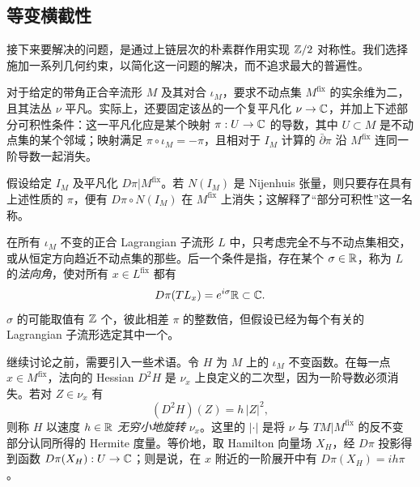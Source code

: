 \subsection{等变横截性}\label{sec:14c}
接下来要解决的问题，是通过上链层次的朴素群作用实现 $\mathbb Z/2$ 对称性。我们选择施加一系列几何约束，以简化这一问题的解决，而不追求最大的普遍性。

\begin{assumption}\label{st:14.3}
对于给定的带角正合辛流形 $M$ 及其对合 $\iota_M$，要求不动点集 $M^{\mathrm{fix}}$ 的实余维为二，且其法丛 $\nu$ 平凡。实际上，还要固定该丛的一个复平凡化 $\nu\to\mathbb C$，并加上下述部分可积性条件：这一平凡化应是某个映射 $\pi:U\to\mathbb C$ 的导数，其中 $U\subset M$ 是不动点集的某个邻域；映射满足 $\pi\circ\iota_M=-\pi$，且相对于 $I_M$ 计算的 $\bar\partial\pi$ 沿 $M^{\mathrm{fix}}$ 连同一阶导数一起消失。
\end{assumption}

假设给定 $I_M$ 及平凡化 $D\pi|M^{\mathrm{fix}}$。若 $N(I_M)$ 是 Nijenhuis 张量，则只要存在具有上述性质的 $\pi$，便有 $D\pi\circ N(I_M)$ 在 $M^{\mathrm{fix}}$ 上消失；这解释了“部分可积性”这一名称。

\begin{assumption}\label{st:14.4}
在所有 $\iota_M$ 不变的正合 Lagrangian 子流形 $L$ 中，只考虑完全不与不动点集相交，或从恒定方向趋近不动点集的那些。后一个条件是指，存在某个 $\sigma\in\mathbb R$，称为 $L$ 的\emph{法向角}，使对所有 $x\in L^{\mathrm{fix}}$ 都有
\[
D\pi(TL_x)=e^{i\sigma}\mathbb R\subset\mathbb C.
\]
$\sigma$ 的可能取值有 $\mathbb Z$ 个，彼此相差 $\pi$ 的整数倍，但假设已经为每个有关的 Lagrangian 子流形选定其中一个。
\end{assumption}

继续讨论之前，需要引入一些术语。令 $H$ 为 $M$ 上的 $\iota_M$ 不变函数。在每一点 $x\in M^{\mathrm{fix}}$，法向的 Hessian $D^2H$
是 $\nu_x$ 上良定义的二次型，因为一阶导数必须消失。若对 $Z\in\nu_x$ 有
\begin{equation}\label{eq:14.9}
(D^2H)(Z)=h\,|Z|^2,
\end{equation}
则称 $H$ 以速度 $h\in\mathbb R$ \emph{无穷小地旋转} $\nu_x$。这里的 $|\cdot|$ 是将 $\nu$ 与 $TM|M^{\mathrm{fix}}$ 的反不变部分认同所得的 Hermite 度量。等价地，取 Hamilton 向量场 $X_H$，经 $D\pi$ 投影得到函数 $D\pi(X_H):U\to\mathbb C$；则是说，在 $x$ 附近的一阶展开中有 $D\pi(X_H)=ih\pi$。

